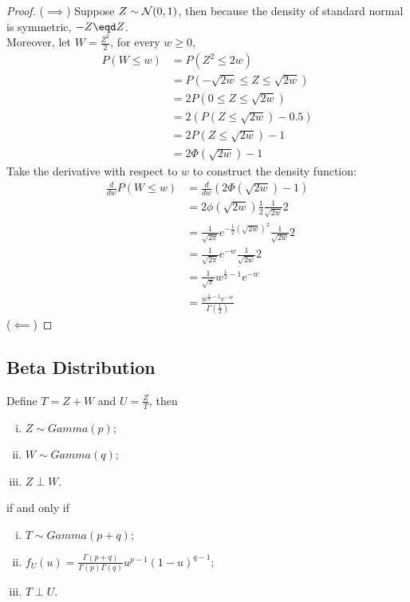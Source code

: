 \documentclass{article}
\begin{document}
   	\begin{proof}
   		($\implies$) Suppose $Z \sim \mathcal{{N}}(0, 1)$, then because the density of standard normal is symmetric, $-Z \eqd Z$. \\
   		Moreover, let $W = \frac{Z^2}{2}$, for every $w \geq 0$,
   		\begin{align}
   			P(W \leq w) &= P(Z^2 \leq 2 w)\\
   			&= P(-\sqrt{2w} \leq Z \leq \sqrt{2w}) \\
   			&= 2 P(0 \leq Z \leq \sqrt{2w}) \\
   			&= 2 (P(Z \leq \sqrt{2w}) - 0.5) \\
   			&= 2 P(Z \leq \sqrt{2w}) - 1 \\
   			&= 2 \Phi(\sqrt{2w}) - 1
   		\end{align}
   		Take the derivative with respect to $w$ to construct the density function:
   		\begin{align}
   			\frac{d}{dw} P(W \leq w) &= \frac{d}{dw} \left( 2 \Phi(\sqrt{2w}) - 1 \right) \\
   			&= 2 \phi(\sqrt{2w}) \frac{1}{2} \frac{1}{\sqrt{2w}} 2 \\
   			&= \frac{1}{\sqrt{2\pi}} e^{-\frac{1}{2}(\sqrt{2w})^2} \frac{1}{\sqrt{2w}} 2\\
   			&= \frac{1}{\sqrt{2\pi}} e^{-w} \frac{1}{\sqrt{2w}} 2 \\
   			&= \frac{1}{\sqrt{\pi}} w^{\frac{1}{2} - 1} e^{-w} \\
   			&= \frac{w^{\frac{1}{2} - 1} e^{-w}}{\Gamma\left(\frac{1}{2}\right)}
   		\end{align}
   		($\impliedby$) 
   	\end{proof}
   	

   	\subsection{Beta Distribution}
   	
   	\begin{theorem}
   		Define $T = Z + W$ and $U = \frac{Z}{T}$, then
   		\begin{enumerate}[(i)]
   			\item $Z \sim Gamma(p)$;
   			\item $W \sim Gamma(q)$;
   			\item $Z \perp W$.
   		\end{enumerate}
   		if and only if
   		\begin{enumerate}[(i)]
   			\item $T \sim Gamma(p + q)$;
   			\item $f_U(u) = \frac{\Gamma(p+q)}{\Gamma(p)\Gamma(q)} u^{p-1} (1-u)^{q-1}$;
   			\item $T \perp U$.
   		\end{enumerate}
   	\end{theorem}
   	
\end{document}
